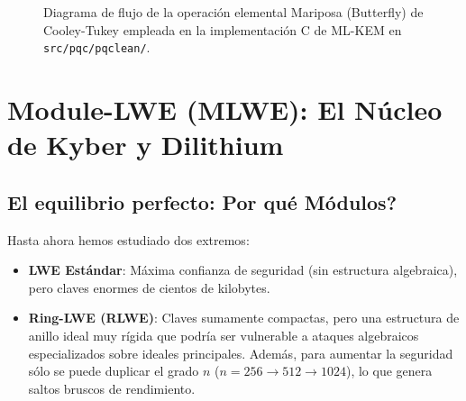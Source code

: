 \documentclass[11pt,a4paper,twoside,openright]{book}
\theoremstyle{plain}
\theoremstyle{definition}
\theoremstyle{remark}
\newcommand{\MLKEM}{\textsf{ML-KEM}}
\begin{document}
\begin{figure}[H]
\centering
{}
\caption{Diagrama de flujo de la operaci\'on elemental Mariposa (Butterfly) de Cooley-Tukey empleada en la implementaci\'on C de \MLKEM{} en \texttt{src/pqc/pqclean/}.}
\label{fig:butterfly_ntt}
\end{figure}

\chapter{Module-LWE (MLWE): El N\'ucleo de Kyber y Dilithium}
\label{chap:mlwe}

\section{El equilibrio perfecto: \textquestiondown Por qu\'e M\'odulos?}

Hasta ahora hemos estudiado dos extremos:
\begin{itemize}
  \item \textbf{LWE Est\'andar}: M\'axima confianza de seguridad (sin estructura algebraica), pero claves enormes de cientos de kilobytes.
  \item \textbf{Ring-LWE (RLWE)}: Claves sumamente compactas, pero una estructura de anillo ideal muy r\'igida que podr\'ia ser vulnerable a ataques algebraicos especializados sobre ideales principales. Adem\'as, para aumentar la seguridad s\'olo se puede duplicar el grado $n$ ($n = 256 \to 512 \to 1024$), lo que genera saltos bruscos de rendimiento.
\end{itemize}
\end{document}
